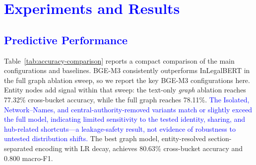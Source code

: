 \documentclass[runningheads]{llncs}
\begin{document}
\section{\textcolor{blue}{Experiments and Results}}
\label{sec:results}

\subsection{\textcolor{blue}{Predictive Performance}}


Table~\ref{tab:accuracy-comparison} reports a compact comparison of the main configurations and baselines. BGE-M3 consistently outperforms InLegalBERT in the full graph ablation sweep, so we report the key BGE-M3 configurations here. Entity nodes add signal within that sweep: the text-only \emph{graph} ablation reaches 77.32\% cross-bucket accuracy, while the full graph reaches 78.11\%. \textcolor{blue}{The Isolated, Network--Names, and central-authority-removed variants match or slightly exceed the full model, indicating limited sensitivity to the tested identity, sharing, and hub-related shortcuts---a leakage-safety result, not evidence of robustness to untested distribution shifts.} The best graph model, entity-resolved section-separated encoding with LR decay, achieves 80.63\% cross-bucket accuracy and 0.800 macro-F1.
\end{document}
